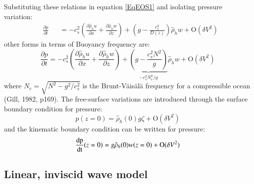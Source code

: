 \documentclass[a4paper,11pt]{article}
\begin{document}
Substituting these relations in equation \ref{EqEOS1} and isolating pressure variation:
\begin{subequations}
  \begin{alignat}{2}
 \nonumber& \frac{\partial p}{\partial t} &&=
 -c_s^{2}\left(\frac{\partial \hat{\rho}_h u}{\partial x}
 +\frac{\partial \hat{\rho}_h w}{\partial z}\right)
 +\left(g-\frac{c_s^2}{D(z)}\right)\hat{\rho}_h w+\mathrm{O}(\delta V^2)
  \end{alignat}
\end{subequations}
other forms in terms of Buoyancy frequency are:
\begin{equation}
 \frac{\partial p}{\partial t} =
 -c_s^{2}\left(\frac{\partial \hat{\rho}_h u}{\partial x}
 +\frac{\partial \hat{\rho}_h w}{\partial z}\right)
 +\underbrace{\left(g-\frac{c_s^2 N^2}{g}\right)}_{-c_s^2 N_c^2/g}
 \hat{\rho}_h w+\mathrm{O}(\delta V^2)
 \label{Eq_EOS1}
\end{equation}
where $N_c=\sqrt{N^2-g^2/c_s^2}$ is the Brunt-Väisälä frequency for a compressible ocean (Gill, 1982, p169). The free-surface variations are introduced through the surface boundary condition for pressure:
\[
 p(z=0) = \hat{\rho}_h(0) g \zeta+\mathrm{O}(\delta V^2)
\]
 and the kinematic boundary condition can be written for pressure:
\[
 \frac{\rm{d}p}{\rm{dt}}(z=0)= g \hat{\rho}_h(0) w(z=0)+\mathrm{O}(\delta V^2)
\]

\bigbreak
\subsection{Linear, inviscid wave model}
\label{SubSectionLinModel}
\end{document}
